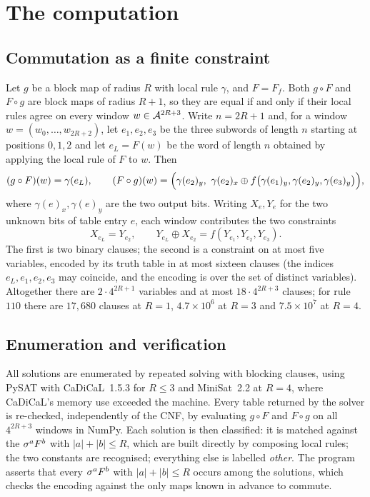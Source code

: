\section{The computation}\label{sec:method}

\subsection{Commutation as a finite constraint}
Let $g$ be a block map of radius $R$ with local rule $\gamma$, and $F=F_f$. Both $g\circ F$ and $F\circ g$ are block maps of radius $R+1$, so they are equal if and only if their local rules agree on every window $w\in\mathcal{A}^{2R+3}$. Write $n=2R+1$ and, for a window $w=(w_0,\dots,w_{2R+2})$, let $e_1,e_2,e_3$ be the three subwords of length $n$ starting at positions $0,1,2$ and let $e_L=F(w)$ be the word of length $n$ obtained by applying the local rule of $F$ to $w$. Then
\[
(g\circ F)(w)=\gamma(e_L),\qquad (F\circ g)(w)=\Bigl(\gamma(e_2)_y,\ \gamma(e_2)_x\oplus f\bigl(\gamma(e_1)_y,\gamma(e_2)_y,\gamma(e_3)_y\bigr)\Bigr),
\]
where $\gamma(e)_x,\gamma(e)_y$ are the two output bits. Writing $X_e,Y_e$ for the two unknown bits of table entry $e$, each window contributes the two constraints
\begin{equation}\label{eq:constraints}
X_{e_L}=Y_{e_2},\qquad Y_{e_L}\oplus X_{e_2}=f(Y_{e_1},Y_{e_2},Y_{e_3}).
\end{equation}
The first is two binary clauses; the second is a constraint on at most five variables, encoded by its truth table in at most sixteen clauses (the indices $e_L,e_1,e_2,e_3$ may coincide, and the encoding is over the set of distinct variables). Altogether there are $2\cdot4^{2R+1}$ variables and at most $18\cdot4^{2R+3}$ clauses; for rule $110$ there are $17{,}680$ clauses at $R=1$, $4.7\times10^6$ at $R=3$ and $7.5\times10^7$ at $R=4$.

\subsection{Enumeration and verification}
All solutions are enumerated by repeated solving with blocking clauses, using PySAT \cite{PySAT} with CaDiCaL~1.5.3 \cite{CaDiCaL} for $R\le3$ and MiniSat~2.2 \cite{MiniSat} at $R=4$, where CaDiCaL's memory use exceeded the machine. Every table returned by the solver is re-checked, independently of the CNF, by evaluating $g\circ F$ and $F\circ g$ on all $4^{2R+3}$ windows in NumPy. Each solution is then classified: it is matched against the $\sigma^aF^b$ with $|a|+|b|\le R$, which are built directly by composing local rules; the two constants are recognised; everything else is labelled \emph{other}. The program asserts that every $\sigma^aF^b$ with $|a|+|b|\le R$ occurs among the solutions, which checks the encoding against the only maps known in advance to commute.

